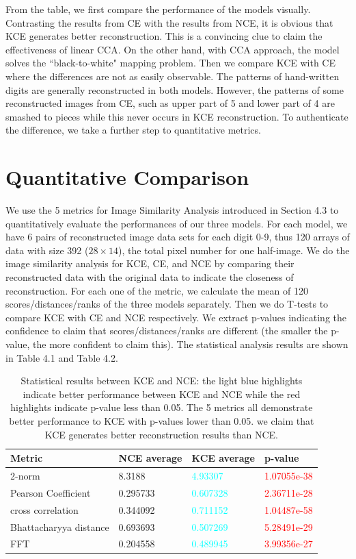 \documentclass[12pt]{report} %
\begin{document}
From the table, we first compare the performance of the models visually. Contrasting the results from CE with the results from NCE, it is obvious that KCE generates better reconstruction. This is a convincing clue to claim the effectiveness of linear CCA. On the other hand, with CCA approach, the model solves the ``black-to-white" mapping problem. Then we compare KCE with CE where the differences are not as easily observable. The patterns of hand-written digits are generally reconstructed in both models. However, the patterns of some reconstructed images from CE, such as upper part of 5 and lower part of 4 are smashed to pieces while this never occurs in KCE reconstruction. To authenticate the difference, we take a further step to quantitative metrics. 

\section{Quantitative Comparison}
We use the 5 metrics for Image Similarity Analysis introduced in Section 4.3 to quantitatively evaluate the performances of our three models. For each model, we have 6 pairs of reconstructed image data sets for each digit 0-9, thus 120 arrays of data with size 392 ($28 \times 14$), the total pixel number for one half-image. We do the image similarity analysis for KCE, CE, and NCE by comparing their reconstructed data with the original data to indicate the closeness of reconstruction. For each one of the metric, we calculate the mean of 120 scores/distances/ranks of the three models separately. Then we do T-tests\cite{TTEST} to compare KCE with CE and NCE respectively. We extract p-values indicating the confidence to claim that scores/distances/ranks are different (the smaller the p-value, the more confident to claim this). The statistical analysis results are shown in Table 4.1 and Table 4.2.

\begin{table}[H]
	\centering
	\begin{tabular}{m{5cm}m{3cm}m{3cm}m{3cm}}
		\toprule
		Metric & NCE average & KCE average & p-value \\
		\midrule
		2-norm & 8.3188 & \textcolor{cyan}{4.93307} & \textcolor{red}{1.07055e-38} \\
		Pearson Coefficient & 0.295733 & \textcolor{cyan}{0.607328} & \textcolor{red}{2.36711e-28} \\
		cross correlation & 0.344092 & \textcolor{cyan}{0.711152} & \textcolor{red}{1.04487e-58} \\
		Bhattacharyya distance & 0.693693 & \textcolor{cyan}{0.507269} & \textcolor{red}{5.28491e-29} \\
		FFT & 0.204558 & \textcolor{cyan}{0.489945} & \textcolor{red}{3.99356e-27} \\
		\bottomrule
	\end{tabular}
	\caption{Statistical results between KCE and NCE: the light blue highlights indicate better performance between KCE and NCE while the red highlights indicate p-value less than 0.05. The 5 metrics all demonstrate better performance to KCE with p-values lower than 0.05. we claim that KCE generates better reconstruction results than NCE.}
\end{table}
\end{document}
